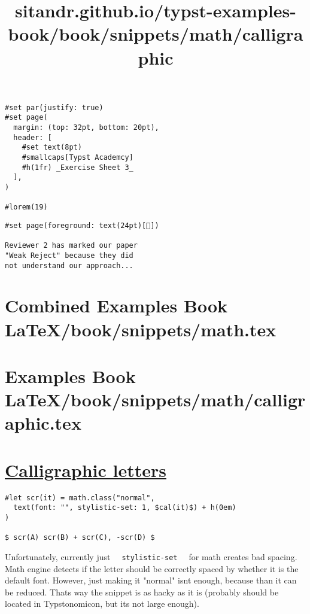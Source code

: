 \begin{verbatim}
#set par(justify: true)
#set page(
  margin: (top: 32pt, bottom: 20pt),
  header: [
    #set text(8pt)
    #smallcaps[Typst Academcy]
    #h(1fr) _Exercise Sheet 3_
  ],
)

#lorem(19)
\end{verbatim}

\pandocbounded{}

\begin{verbatim}
#set page(foreground: text(24pt)[🥸])

Reviewer 2 has marked our paper
"Weak Reject" because they did
not understand our approach...
\end{verbatim}

\pandocbounded{}




\section{Combined Examples Book LaTeX/book/snippets/math.tex}
\section{Examples Book LaTeX/book/snippets/math/calligraphic.tex}
\title{sitandr.github.io/typst-examples-book/book/snippets/math/calligraphic}

\section{\texorpdfstring{\hyperref[calligraphic-letters]{Calligraphic
letters}}{Calligraphic letters}}\label{calligraphic-letters}

\begin{verbatim}
#let scr(it) = math.class("normal",
  text(font: "", stylistic-set: 1, $cal(it)$) + h(0em)
)

$ scr(A) scr(B) + scr(C), -scr(D) $
\end{verbatim}

\pandocbounded{}

Unfortunately, currently just
\texttt{\ }{\texttt{\ stylistic-set\ }}\texttt{\ } for math creates bad
spacing. Math engine detects if the letter should be correctly spaced by
whether it is the default font. However, just making it "normal"
isn\textquotesingle t enough, because than it can be reduced.
That\textquotesingle s way the snippet is as hacky as it is (probably
should be located in Typstonomicon, but it\textquotesingle s not large
enough).


